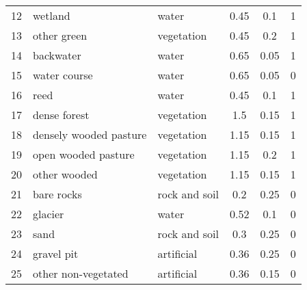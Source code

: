 \documentclass[12pt]{iopart}
\begin{document}
\begin{table}
\begin{center}
\begin{tabular}{ c p{} p{} c c c }
        12 & wetland & water & 0.45 & 0.1 & 1 \\
        13 & other green & vegetation & 0.45 & 0.2 & 1 \\
        14 & backwater & water & 0.65 & 0.05 & 1 \\
        15 & water course & water & 0.65 & 0.05 & 0\\
        16 & reed & water & 0.45 & 0.1 & 1\\
        17 & dense forest & vegetation & 1.5 & 0.15 & 1 \\
        18 & densely wooded pasture & vegetation & 1.15 & 0.15 & 1 \\
        19 & open wooded pasture & vegetation & 1.15 & 0.2 & 1 \\
        20 & other wooded & vegetation & 1.15 & 0.15 & 1\\
        21 & bare rocks & rock and soil & 0.2 & 0.25 & 0 \\
        22 & glacier & water & 0.52 & 0.1 & 0 \\
        23 & sand & rock and soil & 0.3 & 0.25 & 0 \\
        24 & gravel pit & artificial & 0.36 & 0.25 & 0 \\
        25 & other non-vegetated & artificial & 0.36 & 0.15 & 0 \\
        \bottomrule
      \end{tabular}
    \end{center}

\end{table}
\end{document}
